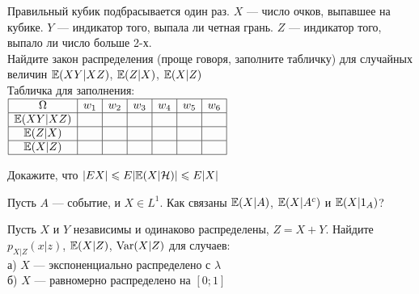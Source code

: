 \begin{problem}
 Правильный кубик подбрасывается один раз. $X$ — число очков, выпавшее на кубике. $Y$ — индикатор того, выпала ли четная грань. $Z$ — индикатор того, выпало ли число больше 2-х. \\
Найдите закон распределения (проще говоря, заполните табличку) для случайных величин $\mathbb{E}(XY|XZ)$, $\mathbb{E}(Z|X)$, $\mathbb{E}(X|Z)$ \\
Табличка для заполнения: \\
$\begin{array}{|c|c|c|c|c|c|c|}
\hline
\Omega & w_{1} & w_{2} & w_{3} & w_{4} & w_{5} & w_{6} \\
\hline
\mathbb{E}(XY|XZ) & & & & & & \\
\hline
\mathbb{E}(Z|X) & & & & & & \\
\hline
\mathbb{E}(X|Z) & & & & & & \\
\hline
\end{array}$

\begin{sol}

\end{sol}
\end{problem}

\begin{problem}
Докажите, что $|EX|\leqslant E|\mathbb{E}(X|\mathcal{H})|\leqslant E|X|$

\begin{sol}

\end{sol}
\end{problem}

\begin{problem}
Пусть $A$ — событие, и $X\in L^{1}$. Как связаны $\mathbb{E}(X|A)$,
$\mathbb{E}(X|A^{c})$ и $\mathbb{E}(X|1_{A})$?

\begin{sol}

\end{sol}
\end{problem}

\begin{problem}
Пусть $X$ и $Y$ независимы и одинаково распределены, $Z=X+Y$. Найдите $p_{X|Z}(x|z)$, $\mathbb{E}(X|Z)$, $\operatorname{Var}(X|Z)$ для случаев: \\
а) $X$ — экспоненциально распределено с $\lambda$ \\
б) $X$ — равномерно распределено на $[0;1]$

\begin{sol}

\end{sol}
\end{problem}

